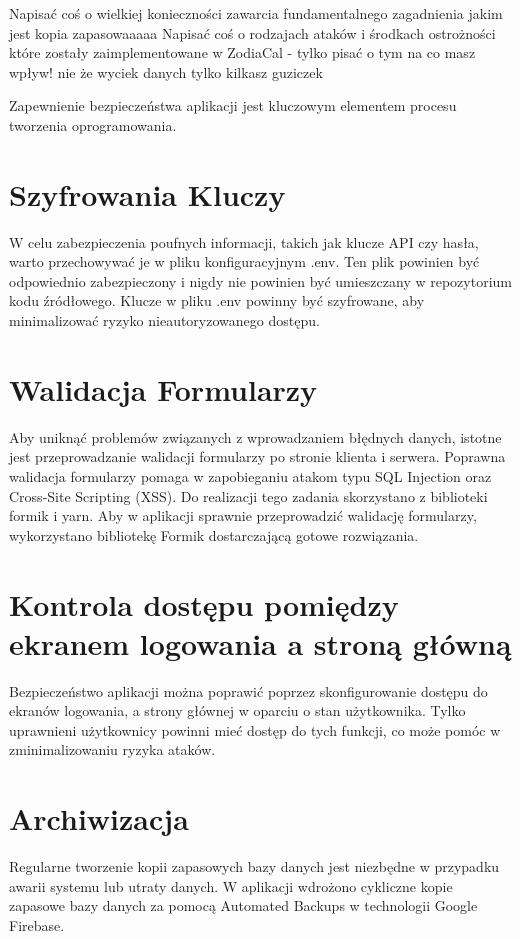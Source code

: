 Napisać coś o wielkiej konieczności zawarcia fundamentalnego zagadnienia jakim jest kopia zapasowaaaaa
Napisać coś o rodzajach ataków i środkach ostrożności które zostały zaimplementowane w ZodiaCal - tylko pisać o tym na co masz wpływ! nie że wyciek danych tylko kilkasz guziczek

Zapewnienie bezpieczeństwa aplikacji jest kluczowym elementem procesu tworzenia oprogramowania.

\section{Szyfrowania Kluczy}
W celu zabezpieczenia poufnych informacji, takich jak klucze API czy hasła, warto przechowywać je w pliku konfiguracyjnym .env. Ten plik powinien być odpowiednio zabezpieczony i nigdy nie powinien być umieszczany w repozytorium kodu źródłowego. Klucze w pliku .env powinny być szyfrowane, aby minimalizować ryzyko nieautoryzowanego dostępu.

\section{Walidacja Formularzy}
Aby uniknąć problemów związanych z wprowadzaniem błędnych danych, istotne jest przeprowadzanie walidacji formularzy po stronie klienta i serwera. Poprawna walidacja formularzy pomaga w zapobieganiu atakom typu SQL Injection oraz Cross-Site Scripting (XSS). Do realizacji tego zadania skorzystano z biblioteki formik i yarn. Aby w aplikacji sprawnie przeprowadzić walidację formularzy, wykorzystano bibliotekę Formik dostarczającą gotowe rozwiązania.

\section{Kontrola dostępu pomiędzy ekranem logowania a stroną główną}
Bezpieczeństwo aplikacji można poprawić poprzez skonfigurowanie dostępu do ekranów logowania, a strony głównej w oparciu o stan użytkownika. Tylko uprawnieni użytkownicy powinni mieć dostęp do tych funkcji, co może pomóc w zminimalizowaniu ryzyka ataków.

\section{Archiwizacja}
Regularne tworzenie kopii zapasowych bazy danych jest niezbędne w przypadku awarii systemu lub utraty danych. W aplikacji wdrożono cykliczne kopie zapasowe bazy danych za pomocą Automated Backups w technologii Google Firebase.
